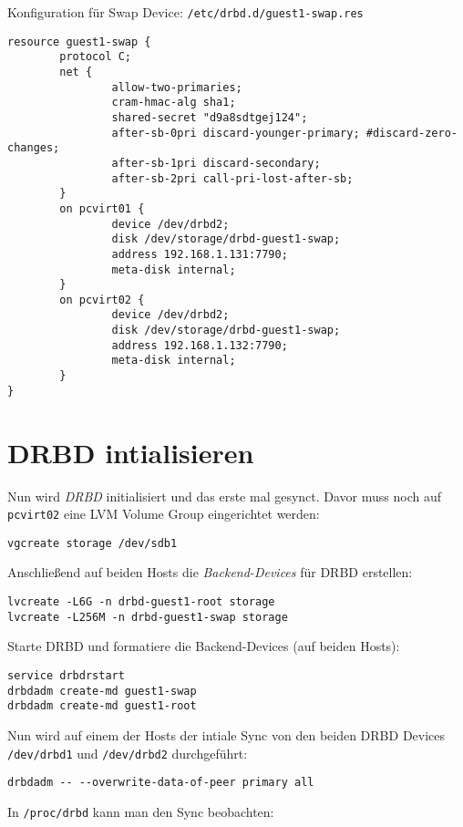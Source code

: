 Konfiguration für Swap Device: \verb|/etc/drbd.d/guest1-swap.res|
\setupVerbatimOut
\begin{verbatim}
resource guest1-swap {
        protocol C;
        net {
                allow-two-primaries;
                cram-hmac-alg sha1;
                shared-secret "d9a8sdtgej124";
                after-sb-0pri discard-younger-primary; #discard-zero-changes;
                after-sb-1pri discard-secondary;
                after-sb-2pri call-pri-lost-after-sb;
        }
        on pcvirt01 {
                device /dev/drbd2;
                disk /dev/storage/drbd-guest1-swap;
                address 192.168.1.131:7790;
                meta-disk internal;
        }
        on pcvirt02 {
                device /dev/drbd2;
                disk /dev/storage/drbd-guest1-swap;
                address 192.168.1.132:7790;
                meta-disk internal;
        }
}
\end{verbatim}


\section{DRBD intialisieren}

Nun wird \emph{DRBD} initialisiert und das erste mal gesynct. Davor muss noch auf \verb#pcvirt02# eine LVM Volume Group eingerichtet werden:

\setupVerbatimOut
\begin{verbatim}
vgcreate storage /dev/sdb1 
\end{verbatim}

Anschließend auf beiden Hosts die \emph{Backend-Devices} für DRBD erstellen:
\setupVerbatimOut
\begin{verbatim}
lvcreate -L6G -n drbd-guest1-root storage
lvcreate -L256M -n drbd-guest1-swap storage
\end{verbatim}

Starte DRBD und formatiere die Backend-Devices (auf beiden Hosts):

\setupVerbatimOut
\begin{verbatim}
service drbdrstart
drbdadm create-md guest1-swap
drbdadm create-md guest1-root
\end{verbatim}


Nun wird auf einem der Hosts der intiale Sync von den beiden DRBD Devices \verb#/dev/drbd1# und \verb#/dev/drbd2# durchgeführt:

\setupVerbatimOut
\begin{verbatim}
drbdadm -- --overwrite-data-of-peer primary all
\end{verbatim}
In \verb#/proc/drbd# kann man den Sync beobachten:

